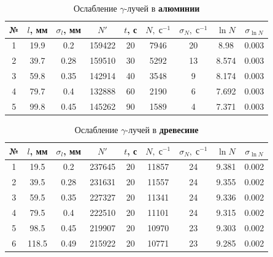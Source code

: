 \documentclass[12pt]{kiarticle} %
\newcommand{\ga}{\ensuremath{\gamma}}
\begin{document}
\begin{table}[h!]
	\caption{Ослабление \ga-лучей в \textbf{алюминии}}
	\begin{center}
		\begin{tabular}{|c|c|c|c|c|c|c|c|c|}
			\hline
			№ & $ l $, мм & $ \sigma_l $, мм & $ N' $ & $ t $, с & $ N, \; с^{-1}$  & $ \sigma_N, \; с^{-1}$ & $ \ln N $ & $ \sigma_{\ln N} $ \\
			\hline
			1 & 19.9 & 0.2 & 159422 & 20 & 7946 & 20 & 8.98 & 0.003 \\
			2 & 39.7 & 0.28 & 159510 & 30 & 5292 & 13 & 8.574 & 0.003 \\
			3 & 59.8 & 0.35 & 142914 & 40 & 3548 & 9 & 8.174 & 0.003 \\
			4 & 79.7 & 0.4 & 132888 & 60 & 2190 & 6 & 7.692 & 0.003 \\
			5 & 99.8 & 0.45 & 145262 & 90 & 1589 & 4 & 7.371 & 0.003 \\
			\hline
		\end{tabular}
	\end{center}
	\label{table_3}
\end{table}

\begin{table}[h]
	\caption{Ослабление \ga-лучей в \textbf{древесине}}
	\begin{center}
		\begin{tabular}{|c|c|c|c|c|c|c|c|c|}
			\hline
			№ & $ l $, мм & $ \sigma_l $, мм & $ N' $ & $ t $, с & $ N, \; с^{-1}$  & $ \sigma_N, \; с^{-1}$ & $ \ln N $ & $ \sigma_{\ln N} $ \\
			\hline
			1 & 19.5 & 0.2 & 237645 & 20 & 11857 & 24 & 9.381 & 0.002 \\
			2 & 39.5 & 0.28 & 231631 & 20 & 11557 & 24 & 9.355 & 0.002 \\
			3 & 59.5 & 0.35 & 227327 & 20 & 11341 & 24 & 9.336 & 0.002 \\
			4 & 79.5 & 0.4 & 222510 & 20 & 11101 & 24 & 9.315 & 0.002 \\
			5 & 98.5 & 0.45 & 219907 & 20 & 10970 & 23 & 9.303 & 0.002 \\
			6 & 118.5 & 0.49 & 215922 & 20 & 10771 & 23 & 9.285 & 0.002 \\
			\hline
		\end{tabular}
	\end{center}
	\label{table_4}
\end{table}


	
	
\end{document}
